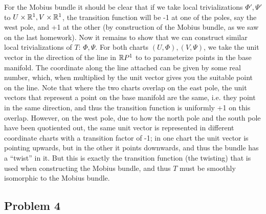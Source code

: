 \documentclass{../../mathnotes}
\begin{document}
For the Mobius bundle it should be clear that if we take local trivializations $\Phi',\Psi'$ to $U\times\mathbb{R}^1,V\times\mathbb{R}^1$,
the transition function will be -1 at one of the poles, say the west pole, and +1 at the other (by construction of the Mobius
bundle, as we saw on the last homework). Now it remains to show that we can construct similar local trivializations
of $T$: $\Phi,\Psi$. For both charts $(U,\Phi),(V,\Psi)$, we take the unit vector in the direction of the line in $\mathbb{R} P^1$
to to parameterize points in the base manifold. The coordinate along the line attached can be given by some real number, which,
when multiplied by the unit vector gives you the suitable point on the line. Note that where the two charts overlap on the
east pole, the unit vectors that represent a point on the base manifold are the same, i.e. they point in the same direction, and
thus the transition function is uniformly +1 on this overlap. However, on the west pole, due to how the north pole and the south
pole have been quotiented out, the same unit vector is represented in different coordinate charts with a transition factor of -1;
in one chart the unit vector is pointing upwards, but in the other it points downwards, and thus the bundle has a ``twist'' in it.
But this is exactly the transition function (the twisting) that is used when constructing the Mobius bundle, and thus $T$ must
be smoothly isomorphic to the Mobius bundle.

\subsection*{Problem 4}
\end{document}
